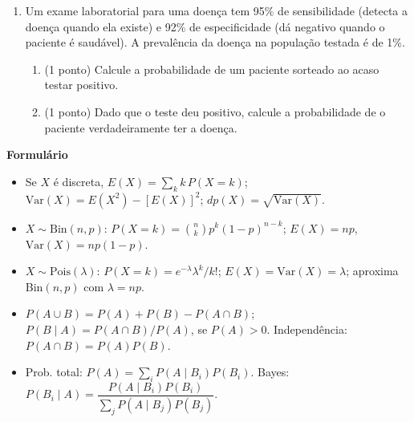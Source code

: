 \documentclass[11pt]{article}
\begin{document}
\begin{enumerate}
\begin{enumerate}
  \item (1 ponto) Qual é a probabilidade de um cliente sorteado estar inadimplente?
  \item (1 ponto) Qual é a probabilidade de um cliente sorteado estar inadimplente, dado que é de
    renda baixa?
  \item (1 ponto) Situação de pagamento e faixa de renda são independentes nesta base? Justifique
    numericamente.
\end{enumerate}

\item Um exame laboratorial para uma doença tem 95\% de sensibilidade (detecta a doença quando ela
existe) e 92\% de especificidade (dá negativo quando o paciente é saudável). A prevalência da
doença na população testada é de 1\%.
\begin{enumerate}
  \item (1 ponto) Calcule a probabilidade de um paciente sorteado ao acaso testar positivo.
  \item (1 ponto) Dado que o teste deu positivo, calcule a probabilidade de o paciente
    verdadeiramente ter a doença.
\end{enumerate}

\end{enumerate}

\vspace{1cm}
\begin{center}
\Large\textbf{Formulário}
\end{center}
\begin{small}
\begin{itemize}
  \item Se $X$ é discreta, $E(X)=\sum_k k\,P(X=k)$; $\mathrm{Var}(X)=E(X^2)-[E(X)]^2$;
    $dp(X)=\sqrt{\mathrm{Var}(X)}$.
  \item $X\sim\text{Bin}(n,p)$: $P(X=k)=\binom{n}{k}p^k(1-p)^{n-k}$; $E(X)=np$,
    $\mathrm{Var}(X)=np(1-p)$.
  \item $X\sim\text{Pois}(\lambda)$: $P(X=k)=e^{-\lambda}\lambda^k/k!$; $E(X)=\mathrm{Var}(X)=\lambda$;
    aproxima Bin$(n,p)$ com $\lambda=np$.
  \item $P(A\cup B)=P(A)+P(B)-P(A\cap B)$; $P(B\mid A)=P(A\cap B)/P(A)$, se $P(A)>0$.
    Independência: $P(A\cap B)=P(A)P(B)$.
  \item Prob. total: $P(A)=\sum_i P(A\mid B_i)P(B_i)$. Bayes: $P(B_i\mid A)=\dfrac{P(A\mid
    B_i)P(B_i)}{\sum_j P(A\mid B_j)P(B_j)}$.
\end{itemize}
\end{small}
\end{document}
